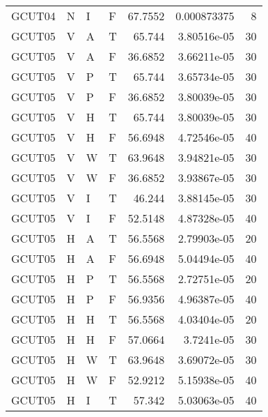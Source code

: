 \begin{longtable}{llllrrr}
    GCUT04   & N         & I         & F          & 67.7552    & 0.000873375 & 8        \\
    GCUT05   & V         & A         & T          & 65.744     & 3.80516e-05 & 30       \\
    GCUT05   & V         & A         & F          & 36.6852    & 3.66211e-05 & 30       \\
    GCUT05   & V         & P         & T          & 65.744     & 3.65734e-05 & 30       \\
    GCUT05   & V         & P         & F          & 36.6852    & 3.80039e-05 & 30       \\
    GCUT05   & V         & H         & T          & 65.744     & 3.80039e-05 & 30       \\
    GCUT05   & V         & H         & F          & 56.6948    & 4.72546e-05 & 40       \\
    GCUT05   & V         & W         & T          & 63.9648    & 3.94821e-05 & 30       \\
    GCUT05   & V         & W         & F          & 36.6852    & 3.93867e-05 & 30       \\
    GCUT05   & V         & I         & T          & 46.244     & 3.88145e-05 & 30       \\
    GCUT05   & V         & I         & F          & 52.5148    & 4.87328e-05 & 40       \\
    GCUT05   & H         & A         & T          & 56.5568    & 2.79903e-05 & 20       \\
    GCUT05   & H         & A         & F          & 56.6948    & 5.04494e-05 & 40       \\
    GCUT05   & H         & P         & T          & 56.5568    & 2.72751e-05 & 20       \\
    GCUT05   & H         & P         & F          & 56.9356    & 4.96387e-05 & 40       \\
    GCUT05   & H         & H         & T          & 56.5568    & 4.03404e-05 & 20       \\
    GCUT05   & H         & H         & F          & 57.0664    & 3.7241e-05  & 30       \\
    GCUT05   & H         & W         & T          & 63.9648    & 3.69072e-05 & 30       \\
    GCUT05   & H         & W         & F          & 52.9212    & 5.15938e-05 & 40       \\
    GCUT05   & H         & I         & T          & 57.342     & 5.03063e-05 & 40       \\

\end{longtable}
